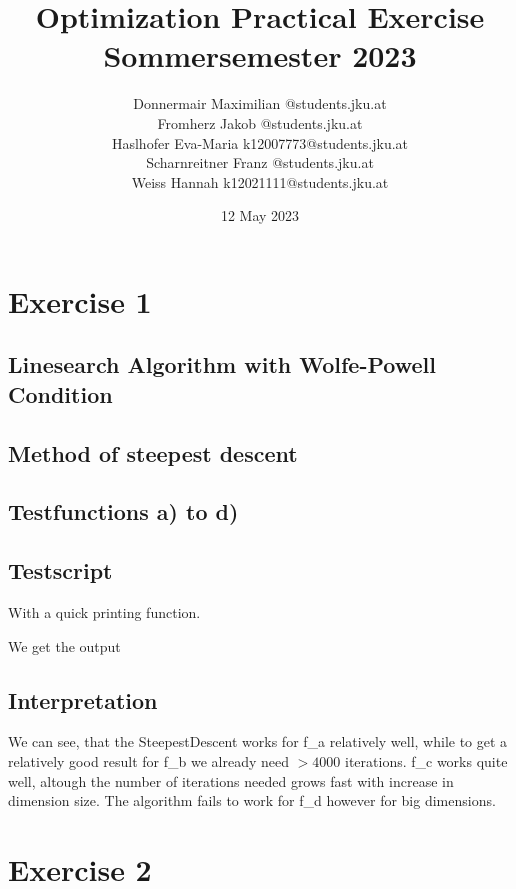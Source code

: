\documentclass{article}
\title{Optimization Practical Exercise \\ Sommersemester 2023}
\author{Donnermair Maximilian @students.jku.at\\ Fromherz Jakob @students.jku.at\\Haslhofer Eva-Maria  k12007773@students.jku.at \\ Scharnreitner Franz @students.jku.at\\ Weiss Hannah k12021111@students.jku.at } %
\date{12 May 2023}
\begin{document}
	
	\maketitle
	
	\newpage
	
	\section{Exercise 1}
	
	\subsection{Linesearch Algorithm with Wolfe-Powell Condition}
	
	
	\subsection{Method of steepest descent}
	
	
	
	\subsection{Testfunctions a) to d)}
	
	
	
	
	
	
	
	
	\subsection{Testscript}
	
	
	With a quick printing function.
	
	
	We get the output
	
	\subsection{Interpretation}
	We can see, that the SteepestDescent works for f\_a relatively well, while to get a relatively good result for f\_b we already need $>4000$ iterations.
	f\_c works quite well, altough the number of iterations needed grows fast with increase in dimension size. The algorithm fails to work for f\_d however for big dimensions.
	
	\section{Exercise 2}
\end{document}
